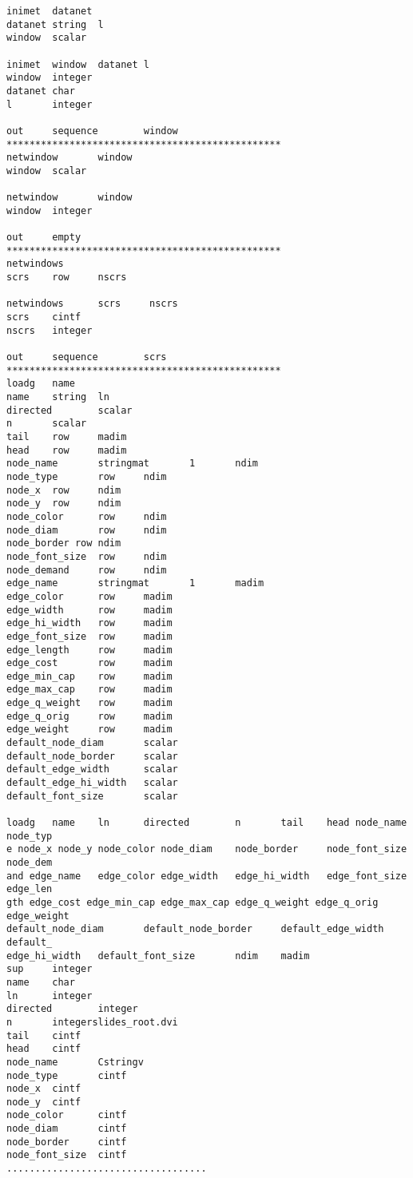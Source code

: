 \begin{verbatim}
inimet  datanet
datanet string  l
window  scalar

inimet  window  datanet l
window  integer
datanet char
l       integer

out     sequence        window
************************************************
netwindow       window
window  scalar

netwindow       window
window  integer

out     empty
************************************************
netwindows
scrs    row     nscrs

netwindows      scrs     nscrs
scrs    cintf
nscrs   integer

out     sequence        scrs
************************************************
loadg   name
name    string  ln
directed        scalar
n       scalar
tail    row     madim
head    row     madim
node_name       stringmat       1       ndim
node_type       row     ndim
node_x  row     ndim
node_y  row     ndim
node_color      row     ndim
node_diam       row     ndim
node_border row ndim
node_font_size  row     ndim
node_demand     row     ndim
edge_name       stringmat       1       madim
edge_color      row     madim
edge_width      row     madim
edge_hi_width   row     madim
edge_font_size  row     madim
edge_length     row     madim
edge_cost       row     madim
edge_min_cap    row     madim
edge_max_cap    row     madim
edge_q_weight   row     madim
edge_q_orig     row     madim
edge_weight     row     madim
default_node_diam       scalar
default_node_border     scalar
default_edge_width      scalar
default_edge_hi_width   scalar
default_font_size       scalar

loadg   name    ln      directed        n       tail    head node_name  node_typ
e node_x node_y node_color node_diam    node_border     node_font_size  node_dem
and edge_name   edge_color edge_width   edge_hi_width   edge_font_size  edge_len
gth edge_cost edge_min_cap edge_max_cap edge_q_weight edge_q_orig edge_weight
default_node_diam       default_node_border     default_edge_width      default_
edge_hi_width   default_font_size       ndim    madim
sup     integer
name    char
ln      integer
directed        integer
n       integerslides_root.dvi
tail    cintf
head    cintf
node_name       Cstringv
node_type       cintf
node_x  cintf
node_y  cintf
node_color      cintf
node_diam       cintf
node_border     cintf
node_font_size  cintf
...................................
\end{verbatim}

